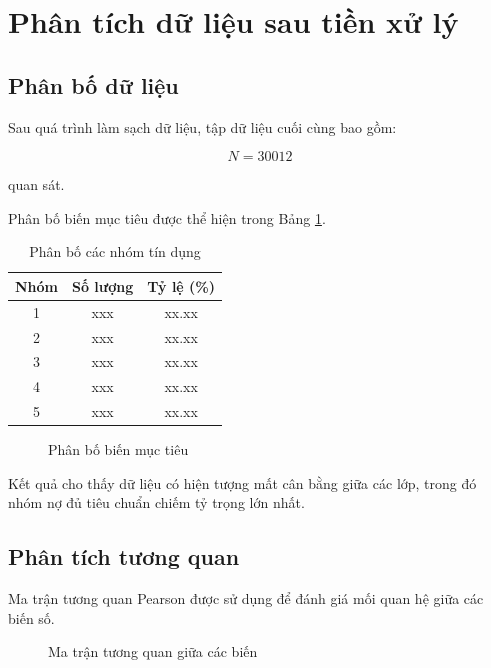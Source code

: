\section{Phân tích dữ liệu sau tiền xử lý}

\subsection{Phân bố dữ liệu}

Sau quá trình làm sạch dữ liệu, tập dữ liệu cuối cùng bao gồm:

\[
N = 30012
\]

quan sát.

Phân bố biến mục tiêu được thể hiện trong Bảng \ref{tab:class_distribution}.

\begin{table}[H]
\centering
\caption{Phân bố các nhóm tín dụng}
\label{tab:class_distribution}
\begin{tabular}{|c|c|c|}
\hline
Nhóm & Số lượng & Tỷ lệ (\%) \\
\hline
1 & xxx & xx.xx \\
2 & xxx & xx.xx \\
3 & xxx & xx.xx \\
4 & xxx & xx.xx \\
5 & xxx & xx.xx \\
\hline
\end{tabular}
\end{table}

\begin{figure}[H]
\centering
\caption{Phân bố biến mục tiêu}
\label{fig:class_distribution}
\end{figure}

Kết quả cho thấy dữ liệu có hiện tượng mất cân bằng giữa các lớp, trong đó nhóm nợ đủ tiêu chuẩn chiếm tỷ trọng lớn nhất.

\subsection{Phân tích tương quan}

Ma trận tương quan Pearson được sử dụng để đánh giá mối quan hệ giữa các biến số.

\begin{figure}[H]
\centering
\caption{Ma trận tương quan giữa các biến}
\label{fig:corr}
\end{figure}

